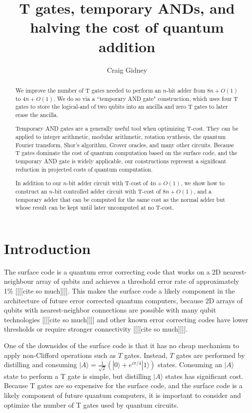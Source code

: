 \documentclass[twocolumn,longbibliography]{quantumarticle-customized}
\title{T gates, temporary ANDs, and halving the cost of quantum addition}
\author{Craig Gidney}
\affiliation{Google, Santa Barbara, CA 93117, USA}
\begin{document}
\maketitle

\begin{abstract}
We improve the number of T gates needed to perform an $n$-bit adder from $8n + O(1)$ \cite{Cuccaro2004, Amy2013, AustinDiscussionsAndEmails2017} to $4n + O(1)$.
We do so via a ``temporary AND gate" construction, which uses four T gates to store the logical-and of two qubits into an ancilla and zero T gates to later erase the ancilla.

Temporary AND gates are a generally useful tool when optimizing T-cost.
They can be applied to integer arithmetic, modular arithmetic, rotation synthesis, the quantum Fourier transform, Shor's algorithm, Grover oracles, and many other circuits.
Because T gates dominate the cost of quantum computation based on the surface code, and the temporary AND gate is widely applicable, our constructions represent a significant reduction in projected costs of quantum computation.

In addition to our $n$-bit adder circuit with T-cost of $4n + O(1)$, we show how to construct an $n$-bit controlled adder circuit with T-cost of $8n + O(1)$, and a temporary adder that can be computed for the same cost as the normal adder but whose result can be kept until later uncomputed at no T-cost.
\end{abstract}


\section{Introduction}
\label{sec:introduction}

The surface code is a quantum error correcting code that works on a 2D nearest-neighbour array of qubits and achieves a threshold error rate of approximately 1\% [[[[cite so much]]]].
This makes the surface code a likely component in the architecture of future error corrected quantum computers, because 2D arrays of qubits with nearest-neighbor connections are possible with many qubit technologies [[[[cite so much]]]] and other known error correcting codes have lower thresholds or require stronger connectivity [[[[cite so much]]]].

One of the downsides of the surface code is that it has no cheap mechanism to apply non-Clifford operations such as $T$ gates.
Instead, $T$ gates are performed by distilling and consuming $|A\rangle = \frac{1}{\sqrt{2}} (|0\rangle + e^{i \pi/4} |1\rangle)$ states.
Consuming an $|A\rangle$ state to perform a T gate is simple, but distilling $|A\rangle$ states has significant cost.
Because T gates are so expensive for the surface code, and the surface code is a likely component of future quantum computers, it is important to consider and optimize the number of T gates used by quantum circuits.
\end{document}
